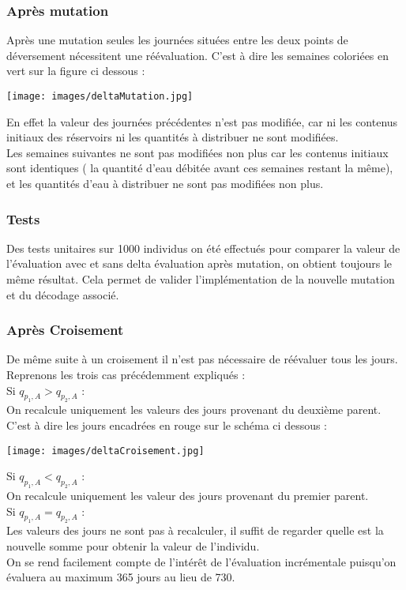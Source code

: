 \documentclass[a4paper]{report}
\begin{document}
\subsubsection*{Après mutation}
Après une mutation seules les journées situées entre les deux points de déversement nécessitent une réévaluation. C'est à dire les semaines coloriées en vert sur la figure ci dessous :\\
\begin{center}
\texttt{[image: images/deltaMutation.jpg]}
\end{center} 
En effet la valeur des journées précédentes n'est pas modifiée, car ni les contenus initiaux des réservoirs ni les quantités à distribuer ne sont modifiées.\\
Les semaines suivantes ne sont pas modifiées non plus car les contenus initiaux sont identiques ( la quantité d'eau débitée avant ces semaines restant la même), et les quantités d'eau à distribuer ne sont pas modifiées non plus.\\
\subsubsection*{Tests }
Des tests unitaires sur 1000 individus on été effectués pour comparer la valeur de l'évaluation avec et sans delta évaluation après mutation, on obtient toujours le même résultat. Cela permet de valider l'implémentation de la nouvelle mutation et du décodage associé.\\
\subsubsection*{Après Croisement}

De même suite à un croisement il n'est pas nécessaire de réévaluer tous les jours.\\
Reprenons les trois cas précédemment expliqués :\\

Si $q_{p_{1},A}> q_{p_{2},A}$ :\\
On recalcule uniquement les valeurs des jours provenant du deuxième parent.\\
C'est à dire les jours encadrées en rouge sur le schéma ci dessous :\\
\begin{center}
\texttt{[image: images/deltaCroisement.jpg]}
\end{center} 
 Si $q_{p_{1},A}<q_{p_{2},A}$ :\\
On recalcule uniquement les valeur des jours provenant du  premier parent.\\
  Si $q_{p_{1},A}=q_{p_{2},A}$ :\\
Les valeurs des jours ne sont pas à recalculer, il suffit de regarder quelle est la nouvelle somme pour obtenir la valeur de l'individu.\\
On se rend facilement compte de l'intérêt de l'évaluation incrémentale puisqu'on évaluera au maximum 365 jours au lieu de 730.
\end{document}
